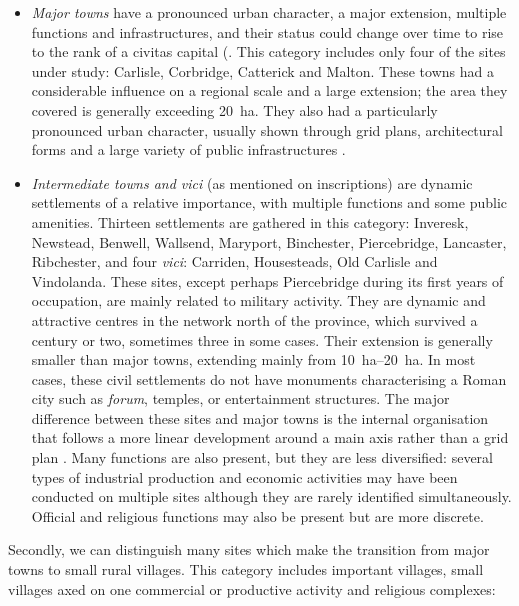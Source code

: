 \begin{itemize}
\item \emph{Major towns} have a pronounced urban character, a major extension, multiple functions and infrastructures, and their status could change over time to rise to the rank of a civitas capital (\parencite[at Carlisle;][933]{RIB_1965}. This category includes only four of the sites under study: Carlisle, Corbridge, Catterick and Malton. These towns had a considerable influence on a regional scale and a large extension; the area they covered is generally exceeding \SI{20}{\hectare}. They also had a particularly pronounced urban character, usually shown through grid plans, architectural forms and a large variety of public infrastructures \parencites{Bishop_1988}{McCarthy_2002}{Wilson_2002a}{Wilson_2002b}{Wilson_2006}.

\item \emph{Intermediate towns and \textit{vici}} (as mentioned on inscriptions) are dynamic settlements of a relative importance, with multiple functions and some public amenities. Thirteen settlements are gathered in this category: Inveresk, Newstead, Benwell, Wallsend, Maryport, Binchester, Piercebridge, Lancaster, Ribchester, and four \textit{vici}: Carriden, Housesteads, Old Carlisle and Vindolanda. These sites, except perhaps Piercebridge \parencite{Cool_2008} during its first years of occupation, are mainly related to military activity. They are dynamic and attractive centres in the network north of the province, which survived a century or two, sometimes three in some cases. Their extension is generally smaller than major towns, extending mainly from \SIrange{10}{20}{\hectare}. In most cases, these civil settlements do not have monuments characterising a Roman city such as \textit{forum}, temples, or entertainment structures. The major difference between these sites and major towns is the internal organisation that follows a more linear development around a main axis rather than a grid plan \parencites{Birley_2009}{Crow_2004}{Osborn_2006}{Sommer_1984}{Sommer_2006}{Wilson_1997}. Many functions are also present, but they are less diversified: several types of industrial production and economic activities may have been conducted on multiple sites although they are rarely identified simultaneously. Official and religious functions may also be present but are more discrete. 
\end{itemize}
Secondly, we can distinguish many sites which make the transition from major towns to small rural villages. This category includes important villages, small villages axed on one commercial or productive activity and religious complexes:

